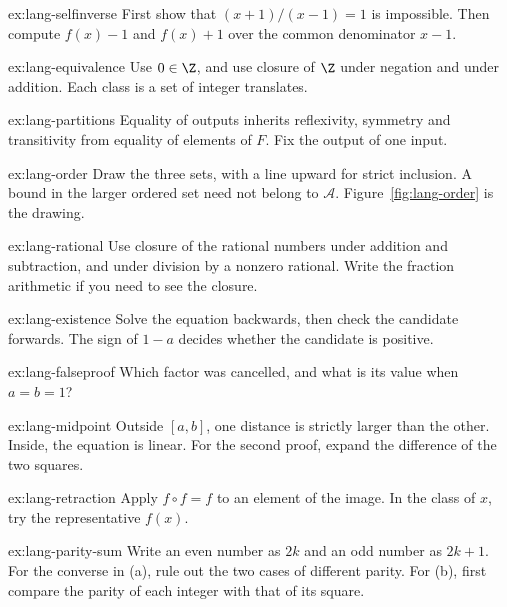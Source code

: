 \begin{hint}{ex:lang-selfinverse}
First show that $(x+1)/(x-1)=1$ is impossible. Then compute $f(x)-1$ and $f(x)+1$ over the common denominator $x-1$.
\end{hint}
\begin{hint}{ex:lang-equivalence}
Use $0\in\Z$, and use closure of $\Z$ under negation and under addition. Each class is a set of integer translates.
\end{hint}
\begin{hint}{ex:lang-partitions}
Equality of outputs inherits reflexivity, symmetry and transitivity from equality of elements of $F$. Fix the output of one input.
\end{hint}
\begin{hint}{ex:lang-order}
Draw the three sets, with a line upward for strict inclusion. A bound in the larger ordered set need not belong to $\mathcal A$. Figure~\ref{fig:lang-order} is the drawing.
\end{hint}
\begin{hint}{ex:lang-rational}
Use closure of the rational numbers under addition and subtraction, and under division by a nonzero rational. Write the fraction arithmetic if you need to see the closure.
\end{hint}
\begin{hint}{ex:lang-existence}
Solve the equation backwards, then check the candidate forwards. The sign of $1-a$ decides whether the candidate is positive.
\end{hint}
\begin{hint}{ex:lang-falseproof}
Which factor was cancelled, and what is its value when $a=b=1$?
\end{hint}
\begin{hint}{ex:lang-midpoint}
Outside $[a,b]$, one distance is strictly larger than the other. Inside, the equation is linear. For the second proof, expand the difference of the two squares.
\end{hint}
\begin{hint}{ex:lang-retraction}
Apply $f\circ f=f$ to an element of the image. In the class of $x$, try the representative $f(x)$.
\end{hint}

\begin{hint}{ex:lang-parity-sum}
Write an even number as $2k$ and an odd number as $2k+1$.
For the converse in (a), rule out the two cases of different parity.
For (b), first compare the parity of each integer with that of its square.
\end{hint}

